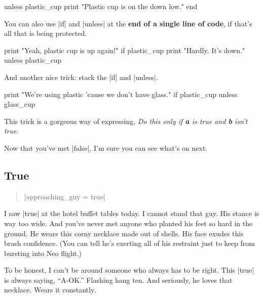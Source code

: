 \documentclass[12pt,twoside]{report}
\begin{document}
\begin{rubycode}

 unless plastic_cup 
   print "Plastic cup is on the down low."  
 end

\end{rubycode}


You can also use \rubyinline|if| and
\rubyinline|unless| at the {\bf end of a single line
  of code}, if that's all that is being protected.


\begin{rubycode}

 print "Yeah, plastic cup is up again!"  if plastic_cup 
 print "Hardly. It's down." unless plastic_cup

\end{rubycode}


And another nice trick: stack the \rubyinline|if| and
\rubyinline|unless|.


\begin{rubycode}

 print "We're using plastic 'cause we don't have glass." if plastic_cup unless glass_cup

\end{rubycode}


This trick is a gorgeous way of expressing, {\em Do this only if {\bf
    a} is true and {\bf b} isn't true}.

Now that you've met \rubyinline|false|, I'm sure you
can see what's on next.


\subsection{True}



\begin{quote}
\rubyinline|approaching_guy = true|\end{quote}


I saw \rubyinline|true| at the hotel buffet tables
today.  I cannot stand that guy. His stance is way too wide.  And
you've never met anyone who planted his feet so hard in the ground.
He wears this corny necklace made out of shells.  His face exudes this
brash confidence.  (You can tell he's exerting all of his restraint
just to keep from bursting into Neo flight.)

To be honest, I can't be around someone who always has to be
right. This \rubyinline|true| is always saying,
``A-OK.''  Flashing hang ten.  And seriously, he loves that necklace.
Wears it constantly.
\end{document}
